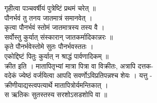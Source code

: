 \documentclass[11pt, openany]{book}
\begin{document}
{{{{{{{{{{{{{{{{{{{{{{{{{{{{{{{{{{{{{{{{{{{{{{{{{{{{{{{{{{{{{{{{{{{{{{{{{{{{{{{{{{{{{{{{{{{{{{{{{{{{{{{{{{{{{{{{{{{{{{{{{{{{{{{{{{{{{गृहीत्वा पञ्चवर्षीयं पुत्रेष्टिं प्रथमं चरेत् ॥\\
पौनर्भवं तु तनय जातमात्रं समानवेत् ।\\
कृत्वा पौनर्भवं स्तोमं जातमात्रस्य तस्य वै ।\\
सर्वोस्तु कुर्यात् संस्कारान् जातकर्मादिकान्नरः ॥\\
कृते पौनर्भवेस्तोमे सुतः पौनर्भवस्ततः ।\\
एकोद्दिष्टं पितुः कुर्यात् न श्राद्धं पार्वणादिकम् ॥\\
क्रीत इति । मातापितृभ्यां मात्रा पित्रा वा विक्रीतः, अत्रापि दत्तक-\\
वदेकं ज्येष्ठं वर्जयित्वा आपदि सवर्णोऽविप्रतिपन्नश्च शेयः । यत्तु -\\
क्रीणीयाद्यस्त्वपत्यार्थे मातापित्रोर्यमन्तिकात् ।\\
स ऋतिकः सुतस्तस्य सरशोऽसडशोपि वा ॥\\
[ अ० ९ श्लो० १७४ ]

}}}}}}}}}}}}}}}}}}}}}}}}}}}}}}}}}}}}}}}}}}}}}}}}}}}}}}}}}}}}}}}}}}}}}}}}}}}}}}}}}}}}}}}}}}}}}}}}}}}}}}}}}}}}}}}}}}}}}}}}}}}}}}}}}}}}}
\end{document}
